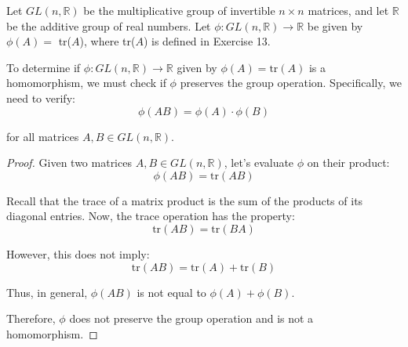 \documentclass[12pt]{amsart}
\theoremstyle{definition}
\numberwithin{equation}{section}
\theoremstyle{plain}
\newcommand{\R}{\mathbb{R}}
\begin{document}
\begin{exercise}{14} Let $GL(n,\R)$ be the multiplicative group of invertible $n \times n$ matrices, and let $\R$ be the additive group of real
    numbers. Let $\phi : GL(n,\R) \rightarrow \R$ be given by $\phi(A) =$ tr($A$), where tr($A$) is defined in Exercise 13.
    
    To determine if \( \phi : GL(n,\mathbb{R}) \rightarrow \mathbb{R} \) given by \( \phi(A) = \text{tr}(A) \) is a homomorphism, we must check if \( \phi \) preserves the group operation. Specifically, we need to verify:    
    \[
        \phi(AB) = \phi(A) \cdot \phi(B)
        \]
        
        for all matrices \( A, B \in GL(n,\mathbb{R}) \). 

        \begin{proof}
Given two matrices \( A, B \in GL(n,\mathbb{R}) \), let's evaluate \( \phi \) on their product:
\[
\phi(AB) = \text{tr}(AB)
\]

Recall that the trace of a matrix product is the sum of the products of its diagonal entries. Now, the trace operation has the property:
\[
\text{tr}(AB) = \text{tr}(BA)
\]

However, this does not imply:
\[
\text{tr}(AB) = \text{tr}(A) + \text{tr}(B)
\]

Thus, in general, \( \phi(AB) \) is not equal to \( \phi(A) + \phi(B) \).

Therefore, \( \phi \) does not preserve the group operation and is not a homomorphism.
    \end{proof}
\end{exercise}
\vspace*{20pt}
\end{document}
